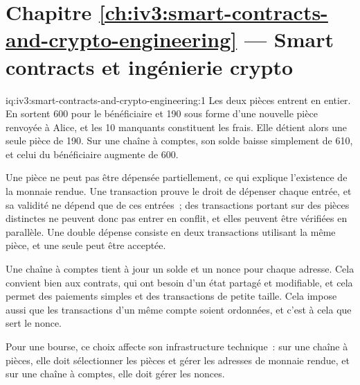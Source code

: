 \section*{Chapitre \ref{ch:iv3:smart-contracts-and-crypto-engineering} --- Smart contracts et ingénierie crypto}

\begin{solution}{iq:iv3:smart-contracts-and-crypto-engineering:1}
Les deux pièces entrent en entier. En sortent 600 pour le bénéficiaire et 190 sous forme d'une nouvelle pièce renvoyée à Alice, et les 10 manquants constituent les frais. Elle détient alors une seule pièce de 190. Sur une chaîne à comptes, son solde baisse simplement de 610, et celui du bénéficiaire augmente de 600.
\enlargethispage{-3\baselineskip}%
\label{lst:iv3:cr:utxo}

Une pièce ne peut pas être dépensée partiellement, ce qui explique l'existence de la monnaie rendue. Une transaction prouve le droit de dépenser chaque entrée, et sa validité ne dépend que de ces entrées~; des transactions portant sur des pièces distinctes ne peuvent donc pas entrer en conflit, et elles peuvent être vérifiées en parallèle. Une double dépense consiste en deux transactions utilisant la même pièce, et une seule peut être acceptée.

Une chaîne à comptes tient à jour un solde et un nonce pour chaque adresse. Cela convient bien aux contrats, qui ont besoin d'un état partagé et modifiable, et cela permet des paiements simples et des transactions de petite taille. Cela impose aussi que les transactions d'un même compte soient ordonnées, et c'est à cela que sert le nonce.

Pour une bourse, ce choix affecte son infrastructure technique~: sur une chaîne à pièces, elle doit sélectionner les pièces et gérer les adresses de monnaie rendue, et sur une chaîne à comptes, elle doit gérer les nonces.

\end{solution}

